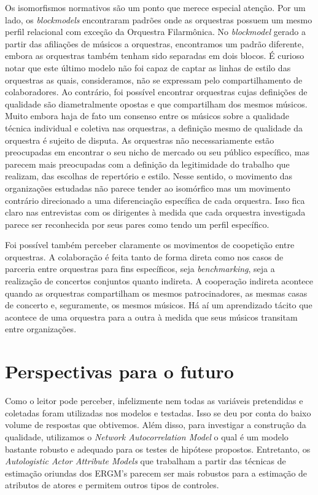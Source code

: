 \documentclass[a4paper, 12pt, openright, oneside, german, french, english, brazil]{abntex2}
\begin{document}
	Os isomorfismos normativos são um ponto que merece especial atenção. Por um lado, os \textit{blockmodels} encontraram padrões onde as orquestras possuem um mesmo perfil relacional com exceção da Orquestra Filarmônica. No \textit{blockmodel} gerado a partir das afiliações de músicos a orquestras, encontramos um padrão diferente, embora as orquestras também tenham sido separadas em dois blocos. É curioso notar que este último modelo não foi capaz de captar as linhas de estilo das orquestras as quais, consideramos, não se expressam pelo compartilhamento de colaboradores. Ao contrário, foi possível encontrar orquestras cujas definições de qualidade são diametralmente opostas e que compartilham dos mesmos músicos. Muito embora haja de fato um consenso entre os músicos sobre a qualidade técnica individual e coletiva nas orquestras, a definição mesmo de qualidade da orquestra é sujeito de disputa. As orquestras não necessariamente estão preocupadas em encontrar o seu nicho de mercado ou seu público específico, mas parecem mais preocupadas com a definição da legitimidade do trabalho que realizam, das escolhas de repertório e estilo. Nesse sentido, o movimento das organizações estudadas não parece tender ao isomórfico mas um movimento contrário direcionado a uma diferenciação específica de cada orquestra. Isso fica claro nas entrevistas com os dirigentes à medida que cada orquestra investigada parece ser reconhecida por seus pares como tendo um perfil específico. 
	
	Foi possível também perceber claramente os movimentos de coopetição entre orquestras. A colaboração é feita tanto de forma direta como nos casos de parceria entre orquestras para fins específicos, seja \textit{benchmarking}, seja a realização de concertos conjuntos quanto indireta. A cooperação indireta acontece quando as orquestras compartilham os mesmos patrocinadores, as mesmas casas de concerto e, seguramente, os mesmos músicos. Há aí um aprendizado tácito que acontece de uma orquestra para a outra à medida que seus músicos transitam entre organizações. 


	\section{Perspectivas para o futuro}
	
	Como o leitor pode perceber, infelizmente nem todas as variáveis pretendidas e coletadas foram utilizadas nos modelos e testadas. Isso se deu por conta do baixo volume de respostas que obtivemos. Além disso, para investigar a construção da qualidade, utilizamos o \textit{Network Autocorrelation Model} o qual é um modelo bastante robusto e adequado para os testes de hipótese propostos. Entretanto, os \textit{Autologistic Actor Attribute Models} que trabalham a partir das técnicas de estimação oriundas dos ERGM's parecem ser mais robustos para a estimação de atributos de atores e permitem outros tipos de controles. 
	
\end{document}
